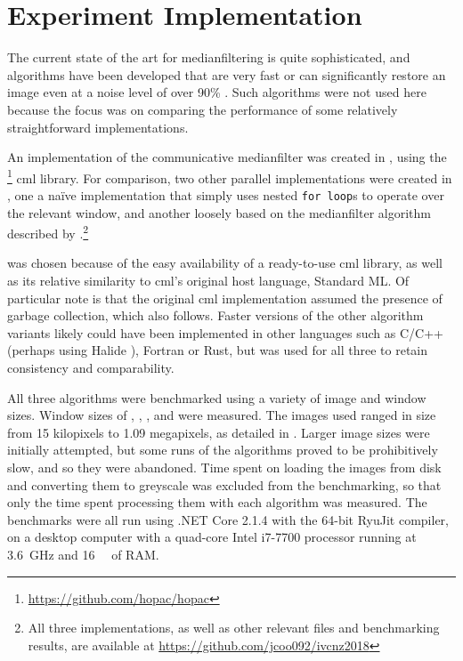 \section{ Experiment Implementation}

The current state of the art for \gls{medianfilter}ing is quite sophisticated, and algorithms have been developed that are very fast \cite{Sanchez2012,Perrot2014} or can significantly restore an image even at a noise level of over 90\% \cite{Gao2015,Wu2011}.  Such algorithms were not used here because the focus was on comparing the performance of some relatively straightforward implementations.

An implementation of the communicative \gls{medianfilter} was created in \fsharp{}, using the \hopac{}\footnote{\url{https://github.com/hopac/hopac}} \gls{cml} library.  For comparison, two other parallel implementations were created in \fsharp{}, one a naïve implementation that simply uses nested \texttt{for loop}s to operate over the relevant window, and another loosely based on the \gls{medianfilter} algorithm described by \citeauthor{Braunl2001} \cite{Braunl2001}.\footnote{All three implementations, as well as other relevant files and benchmarking results, are available at \url{https://github.com/jcoo092/ivcnz2018}}

\fsharp{} was chosen because of the easy availability of a ready-to-use \gls{cml} library, as well as its relative similarity to \gls{cml}'s original host language,  Standard ML.  Of particular note is that the original \gls{cml} implementation assumed the presence of garbage collection, which \hopac{} also follows.  Faster versions of the other algorithm variants likely could have been implemented in other languages such as C/C++ (perhaps using Halide \cite{Ragan-Kelley2017}), Fortran or Rust, but \fsharp{} was used for all three to retain consistency and comparability.  

All three algorithms were benchmarked using a variety of image and window sizes.  Window sizes of , , ,  and  were measured.  The images used ranged in size from 15 kilopixels to 1.09 megapixels, as detailed in .  Larger image sizes were initially attempted, but some runs of the algorithms proved to be prohibitively slow, and so they were abandoned.  Time spent on loading the images from disk and converting them to greyscale was excluded from the benchmarking, so that only the time spent processing them with each algorithm was measured.  The benchmarks were all run using .NET Core 2.1.4 with the 64-bit RyuJit compiler, on a desktop computer with a quad-core Intel i7-7700 processor running at \qty{3.6}{\giga\hertz} and \qty{16}{\giga\byte} of RAM.

